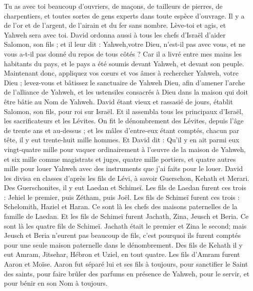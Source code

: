 \begin{multicols}{2}
Tu as avec toi beaucoup d'ouvriers, de maçons, de tailleurs de pierres, de charpentiers, et toutes sortes de gens experts dans toute espèce d'ouvrage.
Il y a de l'or et de l'argent, de l'airain et du fer sans nombre. Lève-toi et agis, et Yahweh sera avec toi.
David ordonna aussi à tous les chefs d'Israël d'aider Salomon, son fils ; et il leur dit :
Yahweh,votre Dieu, n'est-il pas avec vous, et ne vous a-t-il pas donné du repos de tous côtés ? Car il a livré entre mes mains les habitants du pays, et le pays a été soumis devant Yahweh, et devant son peuple.
Maintenant donc, appliquez vos cœurs et vos âmes à rechercher Yahweh, votre Dieu ; levez-vous et bâtissez le sanctuaire de Yahweh Dieu, afin d'amener l'arche de l'alliance de Yahweh, et les ustensiles consacrés à Dieu dans la maison qui doit être bâtie au Nom de Yahweh.
\VerseOne{}David étant vieux et rassasié de jours, établit Salomon, son fils, pour roi sur Israël.
Et il assembla tous les principaux d'Israël, les sacrificateurs et les Lévites.
On fit le dénombrement des Lévites, depuis l'âge de trente ans et au-dessus ; et les mâles d'entre-eux étant comptés, chacun par tête, il y eut trente-huit mille hommes.
Et David dit : Qu'il y en ait parmi eux vingt-quatre mille pour vaquer ordinairement à l'œuvre de la maison de Yahweh, et six mille comme magistrats et juges,
quatre mille portiers, et quatre autres mille pour louer Yahweh avec des instruments que j'ai faits pour le louer.
David les divisa en classes d'après les fils de Lévi, à savoir Guerschon, Kehath et Merari.
Des Guerschonites, il y eut Laedan et Schimeï.
Les fils de Laedan furent ces trois : Jehiel le premier, puis Zétham, puis Joël.
Les fils de Schimeï furent ces trois : Schelomith, Haziel et Haran. Ce sont là les chefs des maisons paternelles de la famille de Laedan.
Et les fils de Schimeï furent Jachath, Zina, Jeusch et Beria. Ce sont là les quatre fils de Schimeï.
Jachath était le premier et Zina le second; mais Jeusch et Beria n'eurent pas beaucoup de fils, c'est pourquoi ils furent comptés pour une seule maison paternelle dans le dénombrement.
Des fils de Kehath il y eut Amram, Jitsehar, Hébron et Uziel, en tout quatre.
Les fils d'Amram furent Aaron et Moïse. Aaron fut séparé lui et ses fils à toujours, pour sanctifier le Saint des saints, pour faire brûler des parfums en présence de Yahweh, pour le servir, et pour bénir en son Nom à toujours.

\end{multicols}
